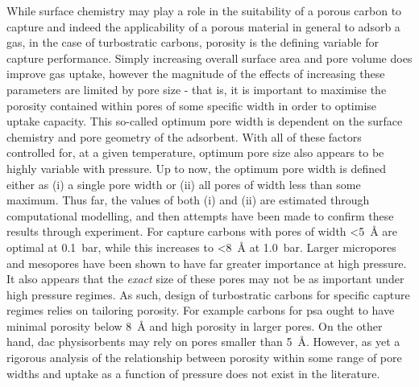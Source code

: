 While surface chemistry may play a role in the suitability of a porous carbon to capture  and indeed the applicability of a porous material in general to adsorb a gas,\citep{Lueking2004, Li2011a, Li2020Sustainable, wang2012significantly, Botome2017Preparation, liang2013, Kayal2018Activated} in the case of \glspl{turbostratic carbon}, porosity is the defining variable for  capture performance.\citep{Sevilla2014Energy, Adeniran2016Is, Sevilla2013Assessment, Choi2019Unique, Lee2013Determination, Presser2011Effect, Wickramaratne2013Importance}  Simply increasing overall surface area and pore volume does improve gas uptake,\citep{Cox2017Ultra, Blankenship2017Cigarette} however the magnitude of the effects of increasing these parameters are limited by pore size\citep{Sevilla2014Energy, Sevilla2013Assessment, Choi2019Unique, Li2019Selective, Cabria2007optimum, Gogotsi2009, Masika2012} - that is, it is important to maximise the porosity contained within pores of some specific width in order to optimise  uptake capacity. This so-called optimum pore width is dependent on the surface chemistry\citep{wang2012significantly, Kayal2018Activated, Lueking2004} and pore geometry\citep{Rzepka1998Physisorption, Zhou2004comparative, Hlushak2018Heat} of the \gls{adsorbent}. With all of these factors controlled for, at a given temperature, optimum pore size also appears to be highly variable with pressure.\citep{Presser2011Effect, DelaCasaLillo2002Hydrogen} Up to now, the optimum pore width is defined either as (i) a single pore width\citep{Sevilla2014Energy, Choi2019Unique, Li2019Selective} or (ii) all pores of width less than some maximum.\citep{Biloe2002Optimal, Cabria2007optimum, Presser2011Effect} Thus far, the values of both (i) and (ii) are estimated through computational modelling,\citep{Biloe2002Optimal, Cabria2007optimum, Hlushak2018Heat} and then attempts have been made to confirm these results through experiment.\citep{Choi2019Unique, Presser2011Effect} For  capture carbons with pores of width \qty{<5}{\angstrom} are optimal at \qty{0.1}{\bar}, while this increases to \qty{<8}{\angstrom} at \qty{1.0}{\bar}.\citep{Presser2011Effect} Larger \glspl{micropore} and \glspl{mesopore} have been shown to have far greater importance at high pressure.\citep{Sevilla2013Assessment, Casco2014Effect, Sevilla2018Optimization} It also appears that the \textit{exact} size of these pores may not be as important under high pressure regimes.\citep{Blankenship2022Modulating} As such, design of \glspl{turbostratic carbon} for specific  capture regimes relies on tailoring porosity. For example carbons for \acrshort{psa} ought to have minimal porosity below \qty{8}{\angstrom} and high porosity in larger pores. On the other hand, \acrshort{dac} physisorbents may rely on pores smaller than \qty{5}{\angstrom}. However, as yet a rigorous analysis of the relationship between porosity within some range of pore widths and  uptake as a function of pressure does not exist in the literature.

%    
%    

